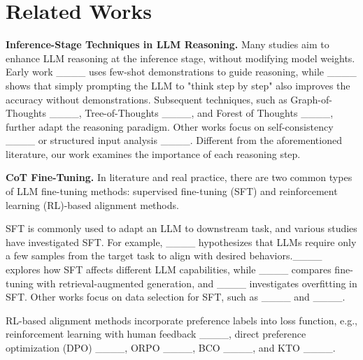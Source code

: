 \section{Related Works}
\label{sec:related}
\vspace{-0.0in}
\noindent\textbf{Inference-Stage Techniques in LLM Reasoning.} Many studies aim to enhance LLM reasoning at the inference stage, without modifying model weights. Early work ____ uses few-shot demonstrations to guide reasoning, while ____ shows that simply prompting the LLM to "think step by step" also improves the accuracy without demonstrations. Subsequent techniques, such as Graph-of-Thoughts ____, Tree-of-Thoughts ____, and Forest of Thoughts ____, further adapt the reasoning paradigm. Other works focus on self-consistency ____ or structured input analysis ____. Different from the aforementioned literature, our work examines the importance of each reasoning step.


\noindent\textbf{CoT Fine-Tuning.}
In literature and real practice, there are two common types of LLM fine-tuning methods: supervised fine-tuning (SFT) and reinforcement learning (RL)-based alignment methods.

SFT is commonly used to adapt an LLM to downstream task, and various studies have investigated SFT. For example, ____ hypothesizes that LLMs require only a few samples from the target task to align with desired behaviors.____ explores how SFT affects different LLM capabilities, while ____ compares fine-tuning with retrieval-augmented generation, and ____ investigates overfitting in SFT. Other works focus on data selection for SFT, such as ____ and ____.

RL-based alignment methods incorporate preference labels into loss function, e.g., reinforcement learning with human feedback ____, direct preference optimization (DPO) ____, ORPO ____, BCO ____, and KTO ____.
  \vspace{-0.08in}